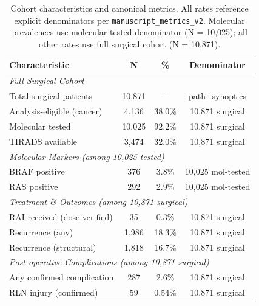 \begin{table}[htbp]
\centering
\small
\begin{tabular}{lccc}
\toprule
Characteristic & N & \% & Denominator \\
\midrule
\multicolumn{4}{l}{\textit{Full Surgical Cohort}} \\
Total surgical patients & 10{,}871 & --- & path\_synoptics \\
Analysis-eligible (cancer) & 4{,}136 & 38.0\% & 10{,}871 surgical \\
Molecular tested & 10{,}025 & 92.2\% & 10{,}871 surgical \\
TIRADS available & 3{,}474 & 32.0\% & 10{,}871 surgical \\
\midrule
\multicolumn{4}{l}{\textit{Molecular Markers (among 10,025 tested)}} \\
BRAF positive & 376 & 3.8\% & 10{,}025 mol-tested \\
RAS positive & 292 & 2.9\% & 10{,}025 mol-tested \\
\midrule
\multicolumn{4}{l}{\textit{Treatment \& Outcomes (among 10,871 surgical)}} \\
RAI received (dose-verified) & 35 & 0.3\% & 10{,}871 surgical \\
Recurrence (any) & 1{,}986 & 18.3\% & 10{,}871 surgical \\
Recurrence (structural) & 1{,}818 & 16.7\% & 10{,}871 surgical \\
\midrule
\multicolumn{4}{l}{\textit{Post-operative Complications (among 10,871 surgical)}} \\
Any confirmed complication & 287 & 2.6\% & 10{,}871 surgical \\
RLN injury (confirmed) & 59 & 0.54\% & 10{,}871 surgical \\
\bottomrule
\end{tabular}
\caption{Cohort characteristics and canonical metrics. All rates reference explicit denominators
per \texttt{manuscript\_metrics\_v2}. Molecular prevalences use molecular-tested denominator
(N = 10{,}025); all other rates use full surgical cohort (N = 10{,}871).}
\label{tab:cohort_demographics}
\end{table}
